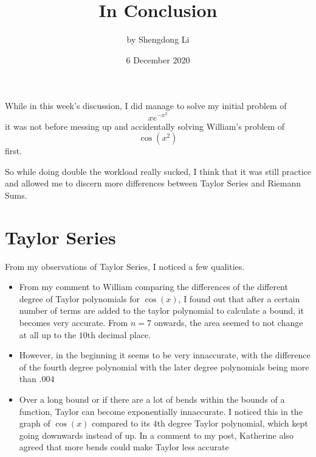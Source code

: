 \documentclass[12pt]{article}
\begin{document}
\title{In Conclusion}
\author{by Shengdong Li}
\date{6 December 2020}
\maketitle

While in this week's discussion, I did manage to solve my initial problem of 
$$
  xe^{-x^{3}}
$$
it was not before messing up and accidentally solving William's problem of
$$
  \cos(x^2)
$$
first.

So while doing double the workload really sucked, I think that it was still practice and allowed me to discern more differences between Taylor Series and Riemann Sums.

\section{Taylor Series}
From my observations of Taylor Series, I noticed a few qualities.
\begin{itemize}
  \item From my comment to William comparing the differences of the different degree of Taylor polynomials for $\cos(x)$, I found out that after a certain number of terms are added to the taylor polynomial to calculate a bound, it becomes very accurate. From $n=7$ onwards, the area seemed to not change at all up to the $10$th decimal place.
  \item However, in the beginning it seems to be very innaccurate, with the difference of the fourth degree polynomial with the later degree polynomials being more than $.004$
  \item Over a long bound or if there are a lot of bends within the bounds of a function, Taylor can become exponentially innaccurate. I noticed this in the graph of $\cos(x)$ compared to its $4$th degree Taylor polynomial, which kept going downwards instead of up. In a comment to my post, Katherine also agreed that more bends could make Taylor less accurate
\end{itemize}
\end{document}
